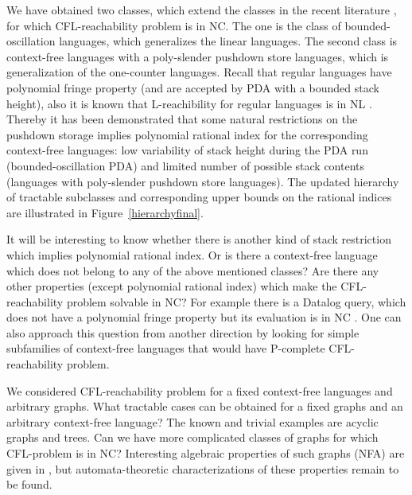 \documentclass[smallextended]{svjour3}       %
\begin{document}
We have obtained two classes, which extend the classes in the recent literature \cite*{ChainQ, LabelledGraphs, LReach, Regularrealizability, Ullman}, for which CFL-reachability problem is in NC. The one is the class of bounded-oscillation languages, which generalizes the linear languages. The second class is context-free languages with a poly-slender pushdown store languages, which is generalization of the one-counter languages. Recall that regular languages have polynomial fringe property (and are accepted by PDA with a bounded stack height), also it is known that L-reachibility for regular languages is in NL \cite*{LReach, Yannakakis}. Thereby it has been demonstrated that some natural restrictions on the pushdown storage implies polynomial rational index for the corresponding context-free languages: low variability of stack height during the PDA run (bounded-oscillation PDA) and limited number of possible stack contents (languages with poly-slender pushdown store languages). The updated hierarchy of tractable subclasses and corresponding upper bounds on the rational indices are illustrated in Figure~\ref{hierarchyfinal}.


It will be interesting to know whether there is another kind of stack restriction which implies polynomial rational index. Or is there a context-free language which does not belong to any of the above mentioned classes? Are there any other properties (except polynomial rational index) which make the CFL-reachability problem solvable in NC? For example there is a Datalog query, which does not have a polynomial fringe property but its evaluation is in NC \cite{Kanellakis}. One can also approach this question from another direction by looking for simple subfamilies of context-free languages that would have P-complete CFL-reachability problem.

We considered CFL-reachability problem for a fixed context-free languages and arbitrary graphs. What tractable cases can be obtained for a fixed graphs and an arbitrary context-free language? The known and trivial examples are acyclic graphs and trees. Can we have more complicated classes of graphs for which CFL-problem is in NC? Interesting algebraic properties of such graphs (NFA) are given in \cite{ganardi2016circuit}, but automata-theoretic characterizations of these properties remain to be found.
\end{document}
